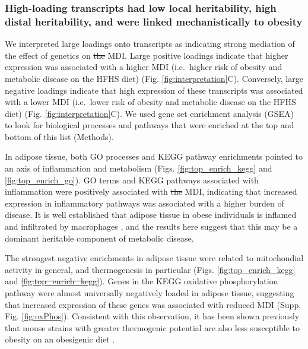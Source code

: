 \documentclass[
]{article}
\providecommand{\DIFaddtex}[1]{{\protect\color{blue}\uwave{#1}}} %
\providecommand{\DIFdeltex}[1]{{\protect\color{red}\sout{#1}}}                      %
\providecommand{\DIFaddbegin}{} %
\providecommand{\DIFaddend}{} %
\providecommand{\DIFdelbegin}{} %
\providecommand{\DIFdelend}{} %
\providecommand{\DIFadd}[1]{\texorpdfstring{\DIFaddtex{#1}}{#1}} %
\providecommand{\DIFdel}[1]{\texorpdfstring{\DIFdeltex{#1}}{}} %
\newcommand{\DIFscaledelfig}{0.5}
\newlength{\DIFdelgraphicswidth} %
\newlength{\DIFdelgraphicsheight} %
\newcommand{\DIFaddincludegraphics}[2][]{{\color{blue}\fbox{\DIFOincludegraphics[#1]{#2}}}} %
\newcommand{\DIFdelincludegraphics}[2][]{%
\sbox{\DIFdelgraphicsbox}{\DIFOincludegraphics[#1]{#2}}%
\settoboxwidth{\DIFdelgraphicswidth}{\DIFdelgraphicsbox} %
\settoboxtotalheight{\DIFdelgraphicsheight}{\DIFdelgraphicsbox} %
\scalebox{\DIFscaledelfig}{%
\parbox[b]{\DIFdelgraphicswidth}{\usebox{\DIFdelgraphicsbox}\\[-\baselineskip] \rule{\DIFdelgraphicswidth}{0em}}\llap{\resizebox{\DIFdelgraphicswidth}{\DIFdelgraphicsheight}{%
\setlength{\unitlength}{\DIFdelgraphicswidth}%
\begin{picture}(1,1)%
\thicklines\linethickness{2pt} %
{\color[rgb]{1,0,0}\put(0,0){\framebox(1,1){}}}%
{\color[rgb]{1,0,0}\put(0,0){\line( 1,1){1}}}%
{\color[rgb]{1,0,0}\put(0,1){\line(1,-1){1}}}%
\end{picture}%
}\hspace*{3pt}}} %
} %
\DeclareRobustCommand{\DIFaddbegin}{\DIFOaddbegin \let\includegraphics\DIFaddincludegraphics} %
\DeclareRobustCommand{\DIFaddend}{\DIFOaddend \let\includegraphics\DIFOincludegraphics} %
\DeclareRobustCommand{\DIFdelbegin}{\DIFOdelbegin \let\includegraphics\DIFdelincludegraphics} %
\DeclareRobustCommand{\DIFdelend}{\DIFOaddend \let\includegraphics\DIFOincludegraphics} %
\begin{document}
\DIFaddbegin \pagebreak

\DIFaddend \subsubsection{High-loading transcripts had low local heritability, high
distal heritability, and were linked mechanistically to
obesity}\label{high-loading-transcripts-had-low-local-heritability-high-distal-heritability-and-were-linked-mechanistically-to-obesity}

We interpreted large loadings onto transcripts as indicating strong
mediation of the effect of genetics on \DIFdelbegin \DIFdel{the }\DIFdelend MDI. Large positive loadings
indicate that higher expression was associated with a higher MDI
(i.e.~higher risk of obesity and metabolic disease on the HFHS diet)
(Fig. \ref{fig:interpretation}C). Conversely, large negative loadings
indicate that high expression of these transcripts was associated with a
lower MDI (i.e.~lower risk of obesity and metabolic disease on the HFHS
diet) (Fig. \ref{fig:interpretation}C). We used gene set enrichment
analysis (GSEA) \cite{fgsea, 
pmid16199517} to look for biological processes and pathways that were
enriched at the top and bottom of this list (Methods).

In adipose tissue, both GO processes and KEGG pathway enrichments
pointed to an axis of inflammation and metabolism (Figs.
\ref{fig:top_enrich_kegg} and \ref{fig:top_enrich_go}). GO terms and
KEGG pathways associated with inflammation were positively associated
with \DIFdelbegin \DIFdel{the }\DIFdelend MDI, indicating that increased expression in inflammatory pathways
was associated with a higher burden of disease. It is well established
that adipose tissue in obese individuals is inflamed and infiltrated by
macrophages \cite{pmid19133410, 
pmid28955384, pmid28912810, pmid28901330, pmid24969772}, and the results
here suggest that this may be a dominant heritable component of
metabolic disease.

The strongest negative enrichments in adipose tissue were related to
mitochondial activity in general, and thermogenesis in particular (Figs.
\ref{fig:top_enrich_kegg} and \DIFdelbegin \DIFdel{\ref{fig:top_enrich_kegg}}\DIFdelend \DIFaddbegin \DIFadd{\ref{fig:top_enrich_go}}\DIFaddend ). Genes in the
KEGG oxidative phosphorylation pathway were almost universally
negatively loaded in adipose tissue, suggesting that increased
expression of these genes was associated with reduced MDI (Supp. Fig.
\ref{fig:oxPhos}). Consistent with this observation, it has been shown
previously that mouse strains with greater thermogenic potential are
also less susceptible to obesity on an obesigenic diet
\cite{pmid18492779}.
\end{document}
